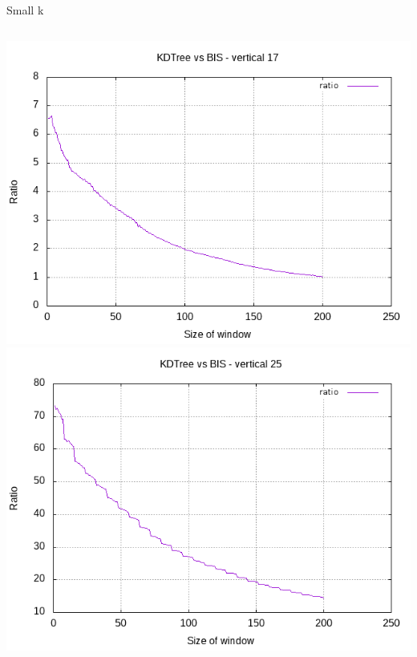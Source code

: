 \documentclass[pdf]{beamer}
\begin{document}
\begin{frame}{Small k}
  \begin{columns}
    \includegraphics[scale=0.35]{pictures/analysis/smalls/vert_fac_17.png}
    \includegraphics[scale=0.35]{pictures/analysis/smalls/vert_fac_25.png}
  \end{columns}
\end{frame}
\end{document}
